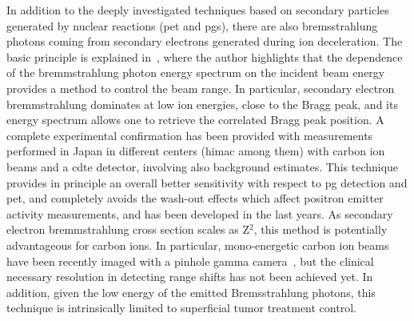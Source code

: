 In addition to the deeply investigated techniques based  on secondary particles generated by nuclear reactions (\gls{pet} and \glspl{pg}), there are also bremsstrahlung photons coming from secondary electrons generated during ion deceleration. The basic principle is explained in~\cite{Yamaguchi2012}, where the author highlights that the dependence of the bremmstrahlung photon energy spectrum on the incident beam energy provides a method to control the beam range. In particular, secondary electron bremmstrahlung dominates at low ion energies, close to the Bragg peak, and its energy spectrum allows one to retrieve the correlated Bragg peak position. A complete experimental confirmation has been provided with measurements performed in Japan in different centers (\gls{himac} among them) with carbon ion beams and a \gls{cdte} detector, involving also background estimates. This technique provides in principle an overall better sensitivity with respect to \gls{pg} detection and \gls{pet}, and completely avoids the wash-out effects which affect positron emitter activity measurements, and has been developed in the last years. As secondary electron bremmstrahlung cross section scales as Z$^2$, this method is potentially advantageous for carbon ions. In particular, mono-energetic carbon ion beams have been recently imaged with a pinhole gamma camera~\parencite{Yamaguchi2018}, but the clinical necessary resolution in detecting range shifts has not been achieved yet. In addition, given the low energy of the emitted Bremsstrahlung photons, this technique is intrinsically limited to superficial tumor treatment control.

